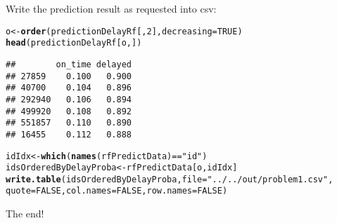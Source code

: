 \documentclass{article}\usepackage[]{graphicx}\usepackage[]{color}
\makeatletter
\newcommand{\hlnum}[1]{\textcolor[rgb]{0.686,0.059,0.569}{#1}}%
\newcommand{\hlstr}[1]{\textcolor[rgb]{0.192,0.494,0.8}{#1}}%
\newcommand{\hlopt}[1]{\textcolor[rgb]{0,0,0}{#1}}%
\newcommand{\hlstd}[1]{\textcolor[rgb]{0.345,0.345,0.345}{#1}}%
\newcommand{\hlkwb}[1]{\textcolor[rgb]{0.69,0.353,0.396}{#1}}%
\newcommand{\hlkwc}[1]{\textcolor[rgb]{0.333,0.667,0.333}{#1}}%
\newcommand{\hlkwd}[1]{\textcolor[rgb]{0.737,0.353,0.396}{\textbf{#1}}}%
\newenvironment{kframe}{%
 \def\at@end@of@kframe{}%
 \ifinner\ifhmode%
  \def\at@end@of@kframe{\end{minipage}}%
  \begin{minipage}{\columnwidth}%
 \fi\fi%
 \def\FrameCommand##1{\hskip\@totalleftmargin \hskip-\fboxsep
 \colorbox{shadecolor}{##1}\hskip-\fboxsep
     \hskip-\linewidth \hskip-\@totalleftmargin \hskip\columnwidth}%
 \MakeFramed {\advance\hsize-\width
   \@totalleftmargin\z@ \linewidth\hsize
   \@setminipage}}%
 {\par\unskip\endMakeFramed%
 \at@end@of@kframe}
\newenvironment{knitrout}{}{} %
\makeatother
\begin{document}
Write the prediction result as requested into csv:
\begin{knitrout}
\color{fgcolor}\begin{kframe}
\begin{alltt}
\hlstd{o} \hlkwb{<-} \hlkwd{order}\hlstd{(predictionDelayRf[,}\hlnum{2}\hlstd{],} \hlkwc{decreasing}\hlstd{=}\hlnum{TRUE}\hlstd{)}
\hlkwd{head}\hlstd{(predictionDelayRf[o,])}
\end{alltt}
\begin{verbatim}
##        on_time delayed
## 27859    0.100   0.900
## 40700    0.104   0.896
## 292940   0.106   0.894
## 499920   0.108   0.892
## 551857   0.110   0.890
## 16455    0.112   0.888
\end{verbatim}
\begin{alltt}
\hlstd{idIdx} \hlkwb{<-} \hlkwd{which}\hlstd{(}\hlkwd{names}\hlstd{(rfPredictData)} \hlopt{==} \hlstr{"id"}\hlstd{)}
\hlstd{idsOrderedByDelayProba} \hlkwb{<-} \hlstd{rfPredictData[o,idIdx]}
\hlkwd{write.table}\hlstd{(idsOrderedByDelayProba,} \hlkwc{file}\hlstd{=}\hlstr{"../../out/problem1.csv"}\hlstd{,}
            \hlkwc{quote}\hlstd{=}\hlnum{FALSE}\hlstd{,} \hlkwc{col.names}\hlstd{=}\hlnum{FALSE}\hlstd{,} \hlkwc{row.names}\hlstd{=}\hlnum{FALSE}\hlstd{)}
\end{alltt}
\end{kframe}
\end{knitrout}

The end!
\end{document}
